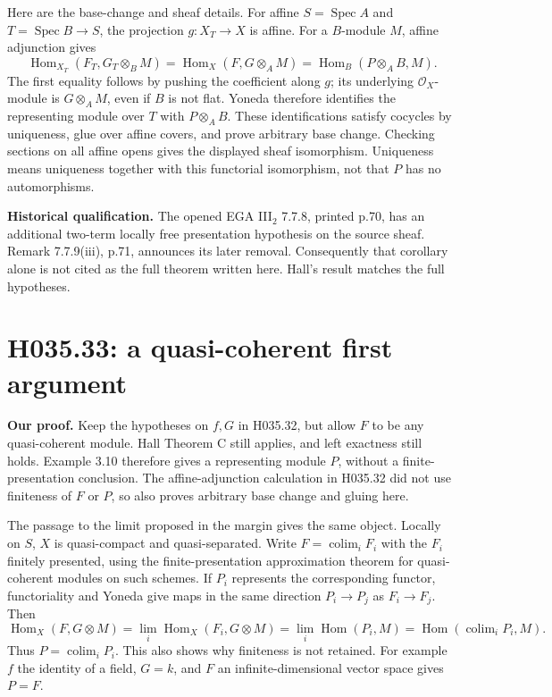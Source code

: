 Here are the base-change and sheaf details. For affine $S=\operatorname{Spec}A$
and $T=\operatorname{Spec}B\to S$, the projection $g:X_T\to X$ is
affine. For a $B$-module $M$, affine adjunction gives
\[
 \operatorname{Hom}_{X_T}(F_T,G_T\otimes_B M)
 =\operatorname{Hom}_X(F,G\otimes_A M)
 =\operatorname{Hom}_B(P\otimes_A B,M).
\]
The first equality follows by pushing the coefficient along $g$;
its underlying $\mathcal O_X$-module is $G\otimes_A M$, even if
$B$ is not flat. Yoneda therefore identifies the representing module
over $T$ with $P\otimes_A B$. These identifications satisfy cocycles
by uniqueness, glue over affine covers, and prove arbitrary base
change. Checking sections on all affine opens gives the displayed
sheaf isomorphism. Uniqueness means uniqueness together with this
functorial isomorphism, not that $P$ has no automorphisms.

\textbf{Historical qualification.} The opened EGA III$_2$ 7.7.8,
printed p.70, has an additional two-term locally free presentation
hypothesis on the source sheaf. Remark 7.7.9(iii), p.71, announces
its later removal. Consequently that corollary alone is not cited as
the full theorem written here. Hall's result matches the full hypotheses.

\section{H035.33: a quasi-coherent first argument}
\textbf{Our proof.} Keep the hypotheses on $f,G$ in H035.32, but
allow $F$ to be any quasi-coherent module. Hall Theorem C still
applies, and left exactness still holds. Example 3.10 therefore gives
a representing module $P$, without a finite-presentation conclusion.
The affine-adjunction calculation in H035.32 did not use finiteness
of $F$ or $P$, so also proves arbitrary base change and gluing here.

The passage to the limit proposed in the margin gives the same object.
Locally on $S$, $X$ is quasi-compact and quasi-separated. Write
$F=\operatorname{colim}_i F_i$ with the $F_i$ finitely presented,
using the finite-presentation approximation theorem for quasi-coherent
modules on such schemes. If $P_i$ represents the corresponding
functor, functoriality and Yoneda give maps in the same direction
$P_i\to P_j$ as $F_i\to F_j$. Then
\[
 \operatorname{Hom}_X(F,G\otimes M)
 =\lim_i\operatorname{Hom}_X(F_i,G\otimes M)
 =\lim_i\operatorname{Hom}(P_i,M)
 =\operatorname{Hom}(\operatorname{colim}_i P_i,M).
\]
Thus $P=\operatorname{colim}_iP_i$. This also shows why finiteness
is not retained. For example $f$ the identity of a field, $G=k$,
and $F$ an infinite-dimensional vector space gives $P=F$.

